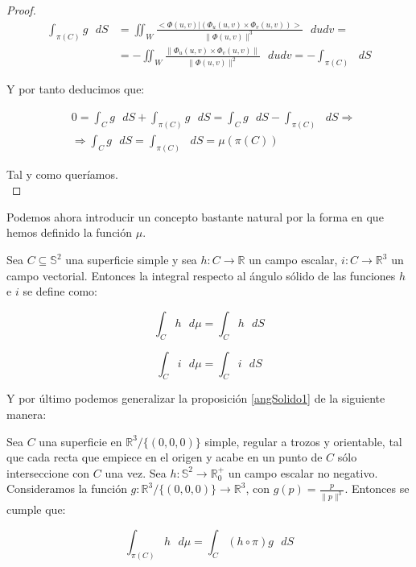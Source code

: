 \begin{proof}
\begin{align*}
  \int _{\pi(C)}g\text{ } dS &= \iint _{W} \frac{<\Phi(u,v) | (\Phi_u(u,v)\times \Phi_v (u,v))>}{\|\Phi(u,v)\|^3}\text{ } du dv =\\
  &= - \iint _{W} \frac{\|\Phi_u(u,v)\times \Phi_v (u,v)\|}{\|\Phi(u,v)\|^2}\text{ } du dv = - \int _{\pi(C)}\text{ } dS
\end{align*}

Y por tanto deducimos que:

\begin{align*}
  & 0 = \int _{C}g\text{ } dS + \int _{\pi(C)}g\text{ } dS = \int _{C}g\text{ } dS - \int _{\pi(C)}\text{ } dS \Rightarrow \\
  & \Rightarrow \int _{C}g\text{ } dS = \int _{\pi(C)}\text{ } dS = \mu (\pi(C))
\end{align*}

Tal y como queríamos.\\
\end{proof}

Podemos ahora introducir un concepto bastante natural por la forma en que hemos definido la función $\mu$.

\begin{definicion}
  Sea $C\subseteq \mathds{S}^2$ una superficie simple y sea $h: C\rightarrow \mathds{R}$ un campo escalar, $i: C\rightarrow \mathds{R}^3$ un campo vectorial. Entonces la integral respecto al ángulo sólido de las funciones $h$ e $i$ se define como:

  $$\int _C h\text{ } d\mu = \int _C h\text{ } dS$$

   $$\int _C i\text{ } d\mu = \int _C i\text{ } dS$$
  
\end{definicion}

Y por último podemos generalizar la proposición \ref{angSolido1} de la siguiente manera:

\begin{proposicion}\label{ToArea}
Sea $C$ una superficie en $\mathds{R}^3/\{(0,0,0)\}$ simple, regular a trozos y orientable, tal que cada recta que empiece en el origen y acabe en un punto de $C$ sólo interseccione con $C$ una vez. Sea $h: \mathds{S}^2\rightarrow \mathds{R}^+_0$ un campo escalar no negativo. Consideramos la función $g:\mathds{R}^3/\{(0,0,0)\} \rightarrow \mathds{R}^3$, con $g(p)=\frac{p}{\|p\|^3}$. Entonces se cumple que:

 \begin{equation}\label{transfToArea}
   \int_{\pi(C)} h\text{ }d\mu = \int _C (h\circ \pi) g \text{ }dS 
 \end{equation}
 
  \end{proposicion}

